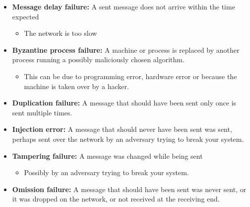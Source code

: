 \documentclass[11pt]{article}
\begin{document}
\begin{itemize}
\item \textbf{Message delay failure:} A sent message does not arrive within the time expected
\begin{itemize}
\item The network is too slow
\end{itemize}

\item \textbf{Byzantine process failure:} A machine or process is replaced by another process running a possibly maliciously chosen algorithm.
\begin{itemize}
\item This can be due to programming error, hardware error or because the machine is taken over by a hacker.
\end{itemize}

\item \textbf{Duplication failure:} A message that should have been sent only once is sent multiple times.
\item \textbf{Injection error:} A message that should never have been sent was sent, perhaps sent over the network by an adversary trying to break your system.
\item \textbf{Tampering failure:} A message was changed while being sent
\begin{itemize}
\item Possibly by an adversary trying to break your system.
\end{itemize}
\item \textbf{Omission failure:} A message that should have been sent was never sent, or it was dropped on the network, or not received at the receiving end.
\end{itemize}
\end{document}
